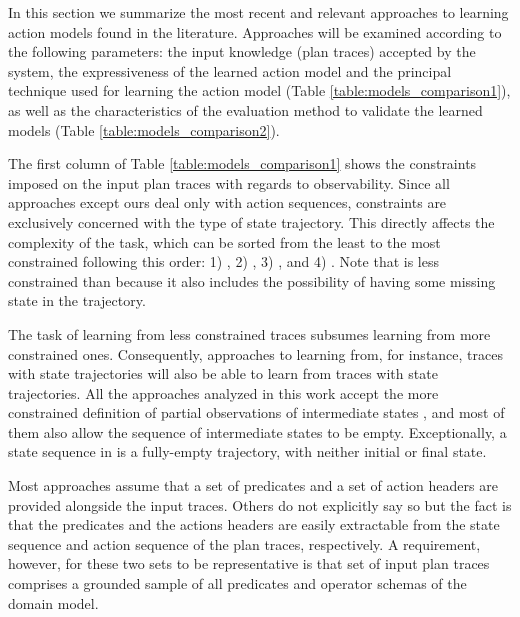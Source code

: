 In this section we summarize the most recent and relevant approaches to learning action models found in the literature. Approaches will be examined according to the following parameters: the input knowledge (plan traces) accepted by the system, the expressiveness of the learned action model and the principal technique used for learning the action model (Table \ref{table:models_comparison1}), as well as the characteristics of the evaluation method to validate the learned models (Table \ref{table:models_comparison2}).

The first column of Table \ref{table:models_comparison1} shows the constraints imposed on the input plan traces with regards to observability. Since all approaches except ours deal only with \FO action sequences, constraints are exclusively concerned with the type of state trajectory. This directly affects the complexity of the task, which can be sorted from the least to the most constrained following this order: 1) \NO, 2) \PO, 3) \POstar, and 4) \FO. Note that \PO is less constrained than \POstar because it also includes the possibility of having some missing state in the trajectory.

The task of learning from less constrained traces subsumes learning from more constrained ones. Consequently, approaches to learning from, for instance, traces with \PO state trajectories will also be able to learn from traces with \POstar state trajectories. All the approaches analyzed in this work accept the more constrained definition of partial observations of intermediate states \POstar, and most of them also allow the sequence of intermediate states to be empty. Exceptionally, a \NO state sequence in \LOCM is a fully-empty trajectory, with neither initial or final state.


Most approaches assume that a set of predicates and a set of action headers are provided alongside the input traces. Others do not explicitly say so but the fact is that the predicates and the actions headers are easily extractable from the state sequence and action sequence of the plan traces, respectively. A requirement, however, for these two sets to be representative is that set of input plan traces comprises a grounded sample of all predicates and operator schemas of the domain model.

